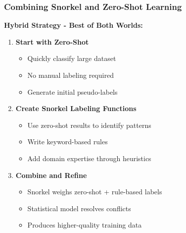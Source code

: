 \documentclass[aspectratio=169]{beamer}
\begin{document}
\begin{frame}
\frametitle{Combining Snorkel and Zero-Shot Learning}

\textbf{Hybrid Strategy - Best of Both Worlds:}

\vspace{0.3cm}

\begin{enumerate}
\item \textbf{Start with Zero-Shot}
\begin{itemize}
\item Quickly classify large dataset
\item No manual labeling required
\item Generate initial pseudo-labels
\end{itemize}

\vspace{0.2cm}

\item \textbf{Create Snorkel Labeling Functions}
\begin{itemize}
\item Use zero-shot results to identify patterns
\item Write keyword-based rules
\item Add domain expertise through heuristics
\end{itemize}

\vspace{0.2cm}

\item \textbf{Combine and Refine}
\begin{itemize}
\item Snorkel weighs zero-shot + rule-based labels
\item Statistical model resolves conflicts
\item Produces higher-quality training data
\end{itemize}

\end{enumerate}
\end{frame}
%
%
\end{document}
